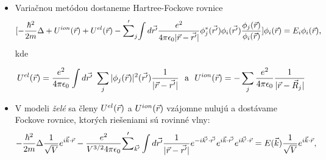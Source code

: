 \documentclass[
	11pt, %
]{beamer}
\begin{document}
\begin{frame}


\begin{itemize}

\item Variačnou metódou dostaneme Hartree-Fockove rovnice
\small
\begin{equation}
\label{eq:fock3}
[-\frac{\hbar^2}{2m}\Delta +U^{ion}(\vec{r})+U^{el}(\vec{r})-
{\sum'}_j{\int d\vec{r'}\frac{e^2}{4\pi \epsilon_0|\vec{r}-\vec{r'}|}
\phi_j^{*}(\vec{r'})\phi_i(\vec{r'})\frac{\phi_j(\vec{r})}{\phi_i(\vec{r})}}]\phi_i({\vec{r}})=E_i\phi_i(\vec{r}) \text{,}
\end{equation}
\normalsize
kde 

\begin{equation}
\label{eq:hartree a ion}
U^{el}(\vec{r}) = \frac{e^2}{4\pi \epsilon_0} \int d\vrp\ \sum_j |\phi_j(\vr)|^2 (\vrp) \frac {1}{|\vr-\vrp|} \ \  \text{a} \ \  U^{ion}(\vec{r}) = -\sum_j\frac{e^2}{4\pi \epsilon_0}{\frac{1}{|\vr-\vR_j|}}
\end{equation}
\normalsize
\item V modeli \emph{želé} sa členy $U^{el}(\vec{r})$ a $U^{ion}(\vec{r})$ vzájomne nulujú a dostávame Fockove rovnice, ktorých riešeniami sú rovinné vlny:
\small
\begin{equation}
\label{eq:fock_final}
-\frac{\hbar^2}{2m}\Delta \frac{1}{\sqrt V}e^{i\vec{k}\cdot\vec{r}}-\frac{e^2}{V^{3/2}4\pi\epsilon_0}{\sum'}_{\vec{k'}}\int d\vec{r'} \frac{1}{|\vec{r}-\vec{r'}|} e^{-i\vec{k'} \cdot \vec{r'} }e^{i\vec{k} \cdot \vec{r'}}e^{i\vec{k'} \cdot \vec{r}}=E(\vec{k})\frac{1}{\sqrt V}e^{i\vec{k} \cdot \vec{r}} \text{,}
\end{equation}
\normalsize
\end{itemize}
\end{frame}
\end{document}
